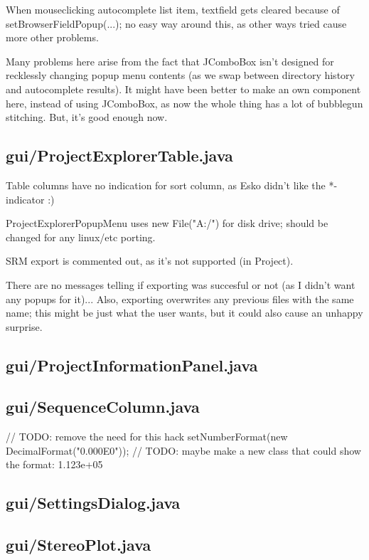 When mouseclicking autocomplete list item, textfield gets cleared because of setBrowserFieldPopup(...); no easy way around this, as other ways tried cause more other problems.

Many problems here arise from the fact that JComboBox isn't designed for recklessly changing popup menu contents (as we swap between directory history and autocomplete results). It might have been better to make an own component here, instead of using JComboBox, as now the whole thing has a lot of bubblegun stitching. But, it's good enough now.


\subsection{gui/ProjectExplorerTable.java}

Table columns have no indication for sort column, as Esko didn't like the *-indicator :)
	    
ProjectExplorerPopupMenu uses new File("A:/") for disk drive; should be changed for any linux/etc porting.

SRM export is commented out, as it's not supported (in Project).

There are no messages telling if exporting was succesful or not (as I didn't want any popups for it)... Also, exporting overwrites any previous files with the same name; this might be just what the user wants, but it could also cause an unhappy surprise.


\subsection{gui/ProjectInformationPanel.java}

\subsection{gui/SequenceColumn.java}
        // TODO: remove the need for this hack
            setNumberFormat(new DecimalFormat("0.000E0"));  // TODO: maybe make a new class that could show the format: 1.123e+05

\subsection{gui/SettingsDialog.java}

\subsection{gui/StereoPlot.java}

